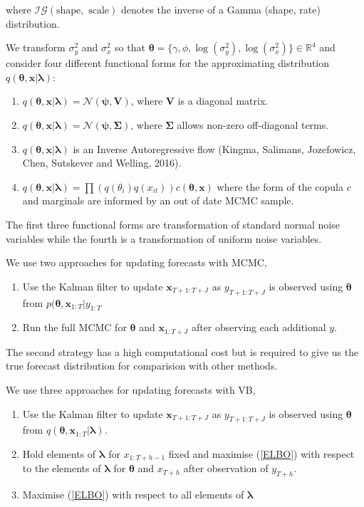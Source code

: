 \documentclass[12pt,a4paper]{article}%
\numberwithin{equation}{section}
\begin{document}
where $\mathcal{IG}(\mbox{shape}, \mbox{ scale})$ denotes the inverse of a Gamma (shape, rate) distribution.

We transform $\sigma^2_y$ and $\sigma^2_x$ so that $\boldsymbol{\theta} = \{\gamma, \phi, \log(\sigma^2_y), \log(\sigma^2_x) \} \in \mathbb{R}^4$ and consider four different functional forms for the approximating distribution $q(\boldsymbol{\theta}, \textbf{x} | \boldsymbol{\lambda})$:
\begin{enumerate}
\item $q(\boldsymbol{\theta}, \textbf{x} | \boldsymbol{\lambda}) = \mathcal{N}(\boldsymbol{\psi}, \textbf{V})$, where $\textbf{V}$ is a diagonal matrix.
\item $q(\boldsymbol{\theta}, \textbf{x} | \boldsymbol{\lambda}) = \mathcal{N}(\boldsymbol{\psi}, \boldsymbol{\Sigma})$, where $\boldsymbol{\Sigma}$ allows non-zero off-diagonal terms.
\item $q(\boldsymbol{\theta}, \textbf{x} | \boldsymbol{\lambda})$ is an Inverse Autoregressive flow (Kingma, Salimans, Jozefowicz, Chen, Sutskever and Welling, 2016).
\item  $q(\boldsymbol{\theta}, \textbf{x} | \boldsymbol{\lambda}) = \prod \left(q(\theta_i) q(x_{it})\right) c(\boldsymbol{\theta}, \textbf{x})$ where the form of the copula $c$ and marginals are informed by an out of date MCMC sample.
\end{enumerate}
The first three functional forms are transformation of standard normal noise variables while the fourth is a transformation of uniform noise variables.

We use two approaches for updating forecasts with MCMC,
\begin{enumerate}
\item Use the Kalman filter to update $\textbf{x}_{T+1:T+J}$ as $y_{T+1:T+J}$ is observed using $\boldsymbol{\theta}$ from $p(\boldsymbol{\theta}, \textbf{x}_{1:T} | y_{1:T}$
\item Run the full MCMC for $\boldsymbol{\theta}$ and $\textbf{x}_{1:T+J}$ after observing each additional $y$.
\end{enumerate}
The second strategy has a high computational cost but is required to give us the true forecast distribution for comparision with other methods.

We use three approaches for updating forecasts with VB,
\begin{enumerate}
\item Use the Kalman filter to update $\textbf{x}_{T+1:T+J}$ as $y_{T+1:T+J}$ is observed using $\boldsymbol{\theta}$ from $q(\boldsymbol{\theta}, \textbf{x}_{1:T} | \boldsymbol{\lambda})$.
\item Hold elements of $\boldsymbol{\lambda}$ for $x_{1:T+h-1}$ fixed and maximise (\ref{ELBO}) with respect to the elements of $\boldsymbol{\lambda}$ for $\boldsymbol{\theta}$ and $x_{T+h}$ after observation of $y_{T+h}$.
\item Maximise (\ref{ELBO}) with respect to all elements of $\boldsymbol{\lambda}$
\end{enumerate}
\end{document}
